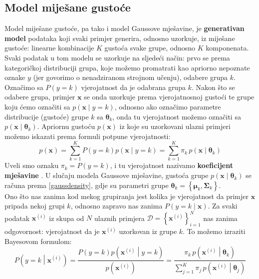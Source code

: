 \documentclass[times, utf8, zavrsni]{fer}
\begin{document}
\subsection{Model miješane gustoće}
Model miješane gustoće, pa tako i model Gaussove mješavine, je \textbf{generativan model} podataka koji svaki primjer generira, odnosno uzorkuje, iz miješane gustoće: linearne kombinacije $K$ gustoća svake grupe, odnosno $K$ komponenata. Svaki podatak u tom modelu se uzorkuje na sljedeći način: prvo se prema kategoričkoj distribuciji grupa, koje možemo promatrati kao apriorno nepoznate oznake $y$ (jer govorimo o nenadziranom strojnom učenju), odabere grupa $k$. Označimo sa $P \left(y = k\right)$ vjerojatnost da je odabrana grupa $k$. Nakon što se odabere grupa, primjer $\mathbf{x}$ se onda uzorkuje prema vjerojatnosnoj gustoći te grupe koju ćemo označiti sa $p \left(\mathbf{x} \middle| y = k\right)$, odnosno ako označimo parametre distribucije (gustoće) grupe $k$ sa $\boldsymbol{\theta}_k$, onda tu vjerojatnost možemo označiti sa $p \left(\mathbf{x} \middle| \boldsymbol{\theta}_k\right)$. Apriornu gustoću $p \left(\mathbf{x}\right)$ iz koje su uzorkovani ulazni primjeri možemo iskazati prema formuli potpune vjerojatnosti:
\begin{equation}
\label{mixdensity}
p \left(\mathbf{x}\right)
=
\sum_{k=1}^{K} P \left(y = k\right) p \left(\mathbf{x} \middle| y = k\right)
=
\sum_{k=1}^{K} \pi_k \, p \left(\mathbf{x} \middle| \boldsymbol{\theta}_k\right)
\end{equation}
Uveli smo oznaku $\pi_k = P \left(y = k\right)$, i tu vjerojatnost nazivamo \textbf{koeficijent mješavine} . U slučaju modela Gaussove mješavine, gustoća grupe $p \left(\mathbf{x} \middle| \boldsymbol{\theta}_k\right)$ se računa prema \ref{gaussdensity}, gdje su parametri grupe
$\boldsymbol{\theta}_k = \left\{
    \boldsymbol{\mu}_k, \boldsymbol{\Sigma}_k
\right\}$.\\
Ono što nas zanima kod mekog grupiranja jest kolika je vjerojatnost da primjer $\mathbf{x}$ pripada nekoj grupi $k$, odnosno zapravo nas zanima $P \left(y = k \middle| \mathbf{x}\right)$. Za svaki podatak $\mathbf{x}^{(i)}$ iz skupa od $N$ ulaznih primjera $\mathcal{D} = \left\{\mathbf{x}^{(i)}\right\}_{i=1}^{N}$ nas zanima odgovornost: vjerojatnost da je $\mathbf{x}^{(i)}$ uzorkovan iz grupe $k$. To možemo izraziti Bayesovom formulom:
\begin{equation}
\label{odgovornost}
P \left(y = k \middle| \mathbf{x}^{(i)}\right)
=
\frac
{P \left(y = k\right) p \left(\mathbf{x}^{(i)} \middle| y = k\right)}
{p \left(\mathbf{x}^{(i)}\right)}
=
\frac
{\pi_k \, p \left(\mathbf{x}^{(i)} \middle| \boldsymbol{\theta}_k\right)}
{\sum_{j=1}^{K} \pi_j \, p \left(\mathbf{x}^{(i)} \middle| \boldsymbol{\theta}_j\right)}
\end{equation}
\end{document}
